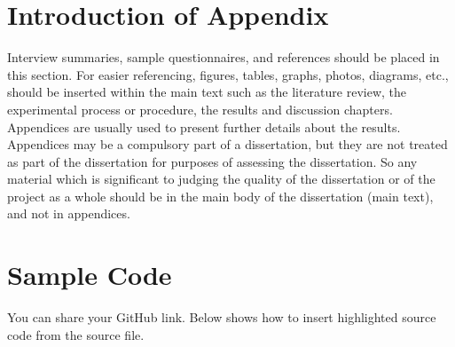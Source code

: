 
\begin{appendices}
\label{cha:appendices}

\chapter{Introduction of Appendix}
\begin{spacing}{2.0}

Interview summaries, sample questionnaires, and references should be placed in this section. For easier referencing, figures, tables, graphs, photos, diagrams, etc., should be inserted within
the main text such as the literature review, the experimental process or procedure, the results and discussion chapters. Appendices are usually used to present further details about the results. Appendices may be a compulsory part of a dissertation, but they are not treated as part of the dissertation for purposes
of assessing the dissertation. So any material which is significant to judging the quality of the dissertation or of the project as a whole should be in the main body of the dissertation (main text), and not in appendices.

\end{spacing}

\chapter{Sample Code}
\begin{spacing}{2.0}

You can share your GitHub link. Below shows how to insert highlighted source code from the source file.

\end{spacing}



\end{appendices}